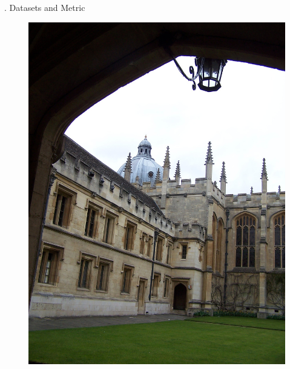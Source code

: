 \documentclass[t]{beamer}
\begin{document}
\begin{frame}{\thesection. Datasets and Metric}
{\begin{figure}
{	                \includegraphics[scale=0.075]{pictures/all_souls_000007}
	            }
	            \subfigure{
}
\end{figure}}
\end{frame}
\end{document}
